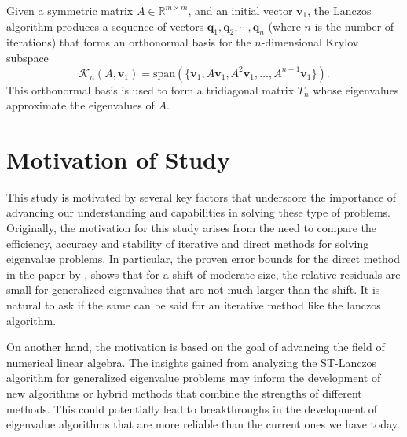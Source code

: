 Given a symmetric matrix $A \in \mathbb{R}^{m\times m}$, and an initial vector $\mathbf{v}_1$, the Lanczos algorithm produces a sequence of vectors $\mathbf{q}_1, \mathbf{q}_2, \cdots, \mathbf{q}_n$ (where $n$ is the number of iterations) that forms an orthonormal basis for the $n$-dimensional Krylov subspace
\begin{equation}\label{eq:KrylovSubspaceDefinition}
       \mathcal{K}_n(A, \mathbf{v}_1) = \text{span}(\{\mathbf{v}_1, A\mathbf{v}_1, A^2\mathbf{v}_1, \ldots, A^{n-1}\mathbf{v}_1\}).
\end{equation}
This orthonormal basis is used to form a tridiagonal matrix $T_n$ whose eigenvalues approximate the eigenvalues of $A$.

\section{Motivation of Study}\label{sec:MotivationOfStudy}

This study is motivated by several key factors that underscore the importance of advancing our understanding and capabilities in solving these type of problems. Originally, the motivation for this study arises from the need to compare the efficiency, accuracy and stability of iterative and direct methods for solving eigenvalue problems. In particular, the proven error bounds for the direct method in the paper by \cite{stewart2024spectraltransformationdensesymmetric}, shows that for a shift of moderate size, the relative residuals are small for generalized eigenvalues that are not much larger than the shift. It is natural to ask if the same can be said for an iterative method like the lanczos algorithm.

On another hand, the motivation is based on the goal of advancing the field of numerical linear algebra. The insights gained from analyzing the ST-Lanczos algorithm for generalized eigenvalue problems may inform the development of new algorithms or hybrid methods that combine the strengths of different methods. This could potentially lead to breakthroughs in the development of eigenvalue algorithms that are more reliable than the current ones we have today.


